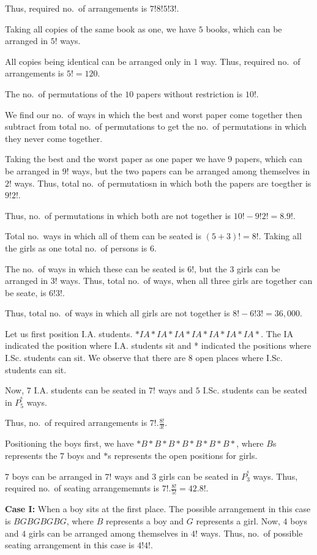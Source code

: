   Thus, required no.\ of arrangements is $7!8!5!3!$.
\item Taking all copies of the same book as one, we have $5$ books, which can be arranged in $5!$ ways.

  All copies being identical can be arranged only in $1$ way. Thus, required no.\ of arrangements is $5! =
  120$.
\item The no.\ of permutations of the $10$ papers without restriction is $10!$.

  We find our no.\ of ways in which the best and worst paper come together then subtract from total no.\ of
  permutations to get the no.\ of permutations in which they never come together.

  Taking the best and the worst paper as one paper we have $9$ papers, which can be arranged in $9!$ ways,
  but the two papers can be arranged among themselves in $2!$ ways. Thus, total no.\ of permutatiosn in which
  both the papers are toegther is $9!2!$.

  Thus, no.\ of permutations in which both are not together is $10! - 9!2! = 8.9!$.
\item Total no.\ ways in which all of them can be seated is $(5 + 3)! = 8!$. Taking all the girls as one
  total no.\ of persons is $6$.

  The no.\ of ways in which these can be seated is $6!$, but the $3$ girls can be arranged in $3!$
  ways. Thus, total no.\ of ways, when all three girls are together can be seate, is $6!3!$.

  Thus, total no.\ of ways in which all girls are not together is $8! - 6!3! = 36,000$.
\item Let us first position I.A. students. $*IA*IA*IA*IA*IA*IA*IA*$. The IA indicated the position where
  I.A. students sit and * indicated the positions where I.Sc. students can sit. We observe that there are
  $8$ open places where I.Sc. students can sit.

  Now, $7$ I.A. students can be seated in $7!$ ways and $5$ I.Sc. students can be seated in $P_5^^8$ ways.

  Thus, no.\ of required arrangements is $7!.\frac{8!}{3!}$.
\item Positioning the boys first, we have $*B*B*B*B*B*B*B*$, where $B$s represents the $7$ boys and $*$s
  represents the open positions for girls.

  $7$ boys can be arranged in $7!$ ways and $3$ girls can be seated in $P_3^^8$ ways. Thus, required no.\ of
  seating arrangememnts is $7!.\frac{8!}{5!} = 42.8!$.
\item {\bf Case I:} When a boy sits at the first place. The possible arrangement in this case is
  $BGBGBGBG$, where $B$ represents a boy and $G$ represents a girl. Now, $4$ boys and $4$ girls can be
  arranged among themselves in $4!$ ways. Thus, no.\ of possible seating arrangement in this case is $4!4!$.

